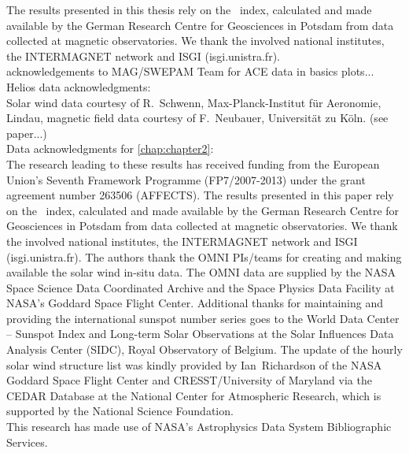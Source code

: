 The results presented in this thesis rely on the \Kp{}~index, calculated and made available by the German Research Centre for Geosciences in Potsdam from data collected at magnetic observatories. We thank the involved national institutes, the INTERMAGNET network and ISGI (isgi.unistra.fr).\\



acknowledgements to MAG/SWEPAM Team for ACE data in basics plots...\\

Helios data acknowledgments:\\
Solar wind data courtesy of R.~Schwenn, Max-Planck-Institut für Aeronomie, Lindau, magnetic field data courtesy of F.~Neubauer, Universität zu Köln. (see paper...)\\

Data acknowledgments for \autoref{chap:chapter2}:\\
The research leading to these results has received funding from the European Union's Seventh Framework Programme (FP7/2007-2013) under the grant agreement number 263506 (AFFECTS). The results presented in this paper rely on the \Kp{}~index, calculated and made available by the German Research Centre for Geosciences in Potsdam from data collected at magnetic observatories. We thank the involved national institutes, the INTERMAGNET network and ISGI (isgi.unistra.fr). The authors thank the OMNI PIs/teams for creating and making available the solar wind in-situ data. The OMNI data are supplied by the NASA Space Science Data Coordinated Archive and the Space Physics Data Facility at NASA's Goddard Space Flight Center. Additional thanks for maintaining and providing the international sunspot number series goes to the World Data Center -- Sunspot Index and Long-term Solar Observations at the Solar Influences Data Analysis Center (SIDC), Royal Observatory of Belgium. The update of the hourly solar wind structure list was kindly provided by Ian~Richardson of the NASA Goddard Space Flight Center and CRESST/University of Maryland via the CEDAR Database at the National Center for Atmospheric Research, which is supported by the National Science Foundation.\\

This research has made use of NASA's Astrophysics Data System Bibliographic Services.\\


